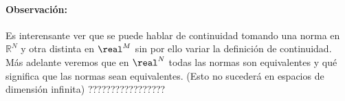 \documentclass[a4paper,10pt]{apuntes}
\begin{document}
\paragraph{Observación:} Es interensante ver que se puede hablar de continuidad tomando una norma en $\mathbb{R}^N$ y otra distinta en $\real^M$ sin por ello variar la definición de continuidad. Más adelante veremos que en $\real^N$ todas las normas son equivalentes y qué significa que las normas sean equivalentes. (Esto no sucederá en espacios de dimensión infinita)
?????????????????
\end{document}
